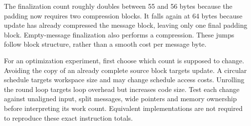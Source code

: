The finalization count roughly doubles between 55 and 56 bytes because the padding now
requires two compression blocks. It falls again at 64 bytes because update has already
compressed the message block, leaving only one final padding block. Empty-message
finalization also performs a compression. These jumps follow block structure, rather
than a smooth cost per message byte.

For an optimization experiment, first choose which count is supposed to change.
Avoiding the copy of an already complete source block targets update. A circular
schedule targets workspace size and may change schedule access costs. Unrolling the
round loop targets loop overhead but increases code size. Test each change against
unaligned input, split messages, wide pointers and memory ownership before interpreting
its work count. Equivalent implementations are not required to reproduce these exact
instruction totals.
